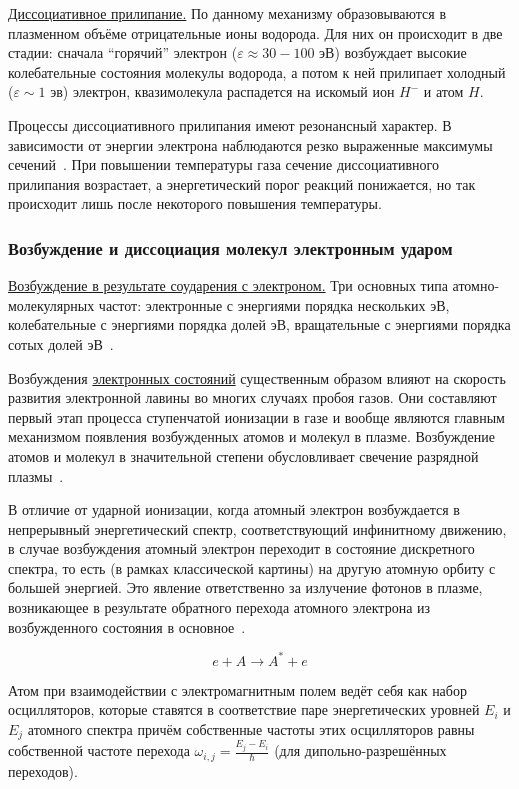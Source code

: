 \documentclass[10pt, a4paper]{article}
\numberwithin{equation}{section}
\begin{document}
\uline{Диссоциативное прилипание.} По данному механизму образовываются в плазменном объёме отрицательные ионы водорода. Для них он происходит в две стадии: сначала ``горячий'' электрон ($\varepsilon \approx 30-100$ эВ) возбуждает высокие колебательные состояния молекулы водорода, а потом к ней прилипает холодный ($\varepsilon \sim 1$ эв) электрон, квазимолекула распадется на искомый ион $H^{-}$ и атом $H$.

Процессы диссоциативного прилипания имеют резонансный характер. В зависимости от энергии электрона наблюдаются резко выраженные максимумы сечений~\cite{raizer}. При повышении температуры газа сечение диссоциативного прилипания возрастает, а энергетический порог реакций понижается, но так происходит лишь после некоторого повышения температуры.

\subsubsection{Возбуждение и диссоциация молекул электронным ударом}

\uline{Возбуждение в результате соударения с электроном.} Три основных типа атомно-молекулярных частот: электронные с энергиями порядка нескольких эВ, колебательные с энергиями порядка долей эВ, вращательные с энергиями порядка сотых долей эВ~\cite{astap}.

Возбуждения \uline{электронных состояний} существенным образом влияют на скорость развития электронной лавины во многих случаях пробоя газов. Они составляют первый этап процесса ступенчатой ионизации в газе и вообще являются главным механизмом появления возбужденных атомов и молекул в плазме. Возбуждение атомов и молекул в значительной степени обусловливает свечение разрядной плазмы~\cite{raizer}.

В отличие от ударной ионизации, когда атомный электрон возбуждается в непрерывный энергетический спектр, соответствующий инфинитному движению, в случае возбуждения атомный электрон переходит в состояние дискретного спектра, то есть (в рамках классической картины) на другую атомную орбиту с большей энергией. Это явление ответственно за излучение фотонов в плазме, возникающее в результате обратного перехода атомного электрона из возбужденного состояния в основное~\cite{astap}.

\begin{equation*}
	e + A \rightarrow A^{*} + e
\end{equation*}

Атом при взаимодействии с электромагнитным полем ведёт себя как набор осцилляторов, которые ставятся в соответствие паре энергетических уровней $E_i$ и $E_j$ атомного спектра причём собственные частоты этих осцилляторов равны собственной частоте перехода $\omega_{i,j}=\frac{E_j-E_i}{\hbar}$ (для дипольно-разрешённых переходов).
\end{document}
